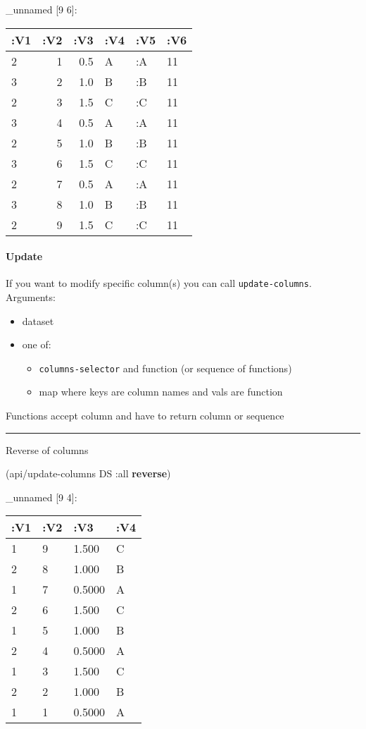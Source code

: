 \documentclass[]{article}
\newenvironment{Shaded}{\begin{snugshade}}{\end{snugshade}}
\newcommand{\KeywordTok}[1]{\textcolor[rgb]{0.13,0.29,0.53}{\textbf{#1}}}
\newcommand{\AttributeTok}[1]{\textcolor[rgb]{0.77,0.63,0.00}{#1}}
\newcommand{\NormalTok}[1]{#1}
\providecommand{\tightlist}{%
  \setlength{\itemsep}{0pt}\setlength{\parskip}{0pt}}
\let\oldparagraph\paragraph
\renewcommand{\paragraph}[1]{\oldparagraph{#1}\mbox{}}
\begin{document}
\_unnamed {[}9 6{]}:

\begin{longtable}[]{@{}lrrlll@{}}
\toprule
:V1 & :V2 & :V3 & :V4 & :V5 & :V6\tabularnewline
\midrule
\endhead
2 & 1 & 0.5 & A & :A & 11\tabularnewline
3 & 2 & 1.0 & B & :B & 11\tabularnewline
2 & 3 & 1.5 & C & :C & 11\tabularnewline
3 & 4 & 0.5 & A & :A & 11\tabularnewline
2 & 5 & 1.0 & B & :B & 11\tabularnewline
3 & 6 & 1.5 & C & :C & 11\tabularnewline
2 & 7 & 0.5 & A & :A & 11\tabularnewline
3 & 8 & 1.0 & B & :B & 11\tabularnewline
2 & 9 & 1.5 & C & :C & 11\tabularnewline
\bottomrule
\end{longtable}

\paragraph{Update}\label{update}

If you want to modify specific column(s) you can call
\texttt{update-columns}. Arguments:

\begin{itemize}
\tightlist
\item
  dataset
\item
  one of:

  \begin{itemize}
  \tightlist
  \item
    \texttt{columns-selector} and function (or sequence of functions)
  \item
    map where keys are column names and vals are function
  \end{itemize}
\end{itemize}

Functions accept column and have to return column or sequence

\begin{center}\rule{0.5\linewidth}{0.5pt}\end{center}

Reverse of columns

\begin{Shaded}
\begin{Highlighting}[]
\NormalTok{(api/update-columns DS }\AttributeTok{:all} \KeywordTok{reverse}\NormalTok{) }
\end{Highlighting}
\end{Shaded}

\_unnamed {[}9 4{]}:

\begin{longtable}[]{@{}llll@{}}
\toprule
:V1 & :V2 & :V3 & :V4\tabularnewline
\midrule
\endhead
1 & 9 & 1.500 & C\tabularnewline
2 & 8 & 1.000 & B\tabularnewline
1 & 7 & 0.5000 & A\tabularnewline
2 & 6 & 1.500 & C\tabularnewline
1 & 5 & 1.000 & B\tabularnewline
2 & 4 & 0.5000 & A\tabularnewline
1 & 3 & 1.500 & C\tabularnewline
2 & 2 & 1.000 & B\tabularnewline
1 & 1 & 0.5000 & A\tabularnewline
\bottomrule
\end{longtable}
\end{document}
